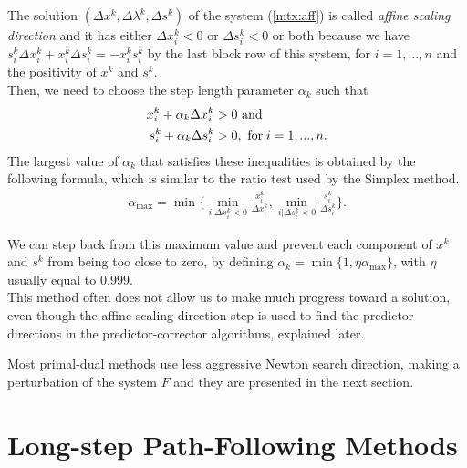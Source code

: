 \documentclass[a4paper,10 pt,titlepage,twoside]{book}
\theoremstyle{plain}
\theoremstyle{definition}
\theoremstyle{remark}
\begin{document}
The solution $\left(\Delta x^{k},\Delta\lambda^{k},\Delta s^{k}\right)$ of the system (\ref{mtx:aff}) is called \textit{affine scaling direction} and it has either $\Delta x_{i}^{k}<0$ or $\Delta s_{i}^{k}<0$ or both because we have $s^{k}_{i}\Delta x^{k}_{i} + x^{k}_{i}\Delta s^{k}_{i} = - x^{k}_{i}s^{k}_{i}$ by the last block row of this system, for $i=1,\dots,n$ and the positivity of $x^{k}$ and $s^{k}$.\\
Then, we need to choose the step length parameter $\alpha_{k}$ such that
\begin{align*}
x^{k}_{i} + \alpha_{k} \Delta x^{k}_{i} &>0 \text{ and}\\
s^{k}_{i} + \alpha_{k} \Delta s^{k}_{i} &>0,\text{ for\;} i = 1,...,n. 
\end{align*}
The largest value of $\alpha_{k}$ that satisfies these inequalities is obtained by the following formula, which is similar to the ratio test used by the Simplex method. 
\begin{align*}
\alpha_{\text{max}} = \min\biggl\{\min_{i|\Delta x^{k}_{i}<0}\frac{x^{k}_{i}}{\Delta x^{k}_{i}}, \min_{i|\Delta s^{k}_{i}<0}\frac{s^{k}_{i}}{\Delta s^{k}_{i}}\biggr\}.
\end{align*} 

We can step back from this maximum value and prevent each component of $x^{k}$ and $s^{k}$ from being too close to zero, by defining $\alpha_{k} = \min\{1,\eta\alpha_{\text{max}}\}$, with $\eta$ usually equal to $0.999$.\\
This method often does not allow us to make much progress toward a solution, even though the affine scaling direction step is used to find the predictor directions in the predictor-corrector algorithms, explained later.

Most primal-dual methods use less aggressive Newton search direction, making a perturbation of the system $F$ and they are presented in the next section.

\section{Long-step Path-Following Methods}
\end{document}
